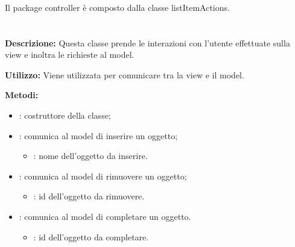 \subsubsection[::Controller]{\class} \label{\class}
Il package controller è composto dalla classe listItemActions.

\paragraph[::listItemActions]{\class}\mbox{}\\ \label{\class}
\textbf{Descrizione:}
Questa classe prende le interazioni con l'utente effettuate sulla view e inoltra le richieste al model.

\textbf{Utilizzo:}
Viene utilizzata per comunicare tra la view e il model.

\textbf{Metodi:}
\begin{itemize}
	\item {}: costruttore della classe;
	\item {}: comunica al model di inserire un oggetto;
	\begin{itemize}
		\item {}: nome dell'oggetto da inserire.
	\end{itemize}
	\item {}: comunica al model di rimuovere un oggetto;
	\begin{itemize}
		\item {}: id dell'oggetto da rimuovere.
	\end{itemize}
	\item {}: comunica al model di completare un oggetto.
	\begin{itemize}
		\item {}: id dell'oggetto da completare.
	\end{itemize}
\end{itemize}
